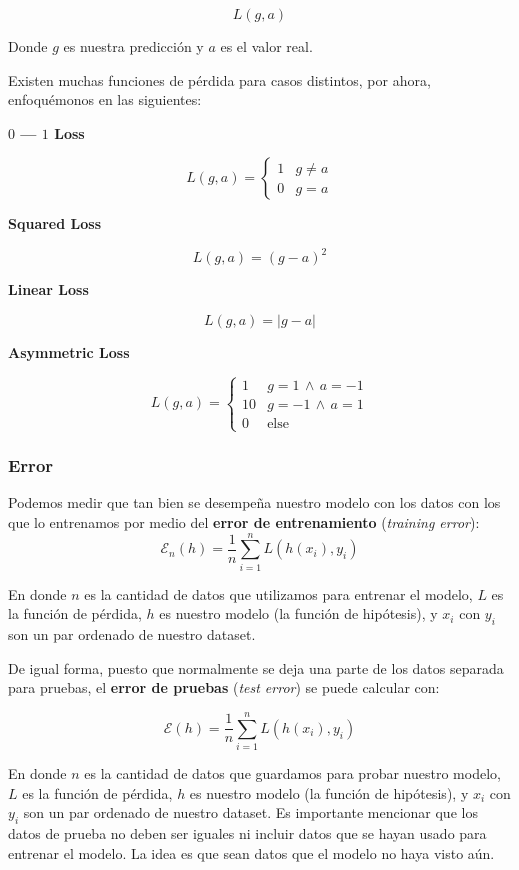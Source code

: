 \[
    L(g, a)
\]

Donde $g$ es nuestra predicción y $a$ es el valor real.

Existen muchas funciones de pérdida para casos distintos, por ahora, enfoquémonos en las siguientes:

\textbf{$0$ --- $1$ Loss}

\[
    L(g, a) = 
    \begin{cases}
        1   &   g \neq a \\
        0   &   g = a
    \end{cases}
\]

\textbf{Squared Loss}

\[
    L(g, a) = {(g - a)}^2
\]

\textbf{Linear Loss}

\[
    L(g, a) = |g - a|
\]

\textbf{Asymmetric Loss}

\[
    L(g, a) = 
    \begin{cases}
        1   &   g = 1 \, \land \, a = -1 \\
        10  &   g = -1 \, \land \, a = 1 \\
        0   &   \text{else}
    \end{cases}
\]

\subsubsection{Error}

Podemos medir que tan bien se desempeña nuestro modelo con los datos con los que lo entrenamos por medio del \textbf{error de entrenamiento} (\textit{training error}):
\[
    \mathcal{E}_n (h) = \frac{1}{n} \sum_{i = 1}^{n} L(h(x_i), y_i)
\]

En donde $n$ es la cantidad de datos que utilizamos para entrenar el modelo, $L$ es la función de pérdida, $h$ es nuestro modelo (la función de hipótesis), y $x_i$ con $y_i$ son un par ordenado de nuestro dataset.

De igual forma, puesto que normalmente se deja una parte de los datos separada para pruebas, el \textbf{error de pruebas} (\textit{test error}) se puede calcular con:

\[
    \mathcal{E} (h) = \frac{1}{n} \sum_{i = 1}^{n} L(h(x_i), y_i)
\]

En donde $n$ es la cantidad de datos que guardamos para probar nuestro modelo, $L$ es la función de pérdida, $h$ es nuestro modelo (la función de hipótesis), y $x_i$ con $y_i$ son un par ordenado de nuestro dataset.
Es importante mencionar que los datos de prueba no deben ser iguales ni incluir datos que se hayan usado para entrenar el modelo.
La idea es que sean datos que el modelo no haya visto aún.

